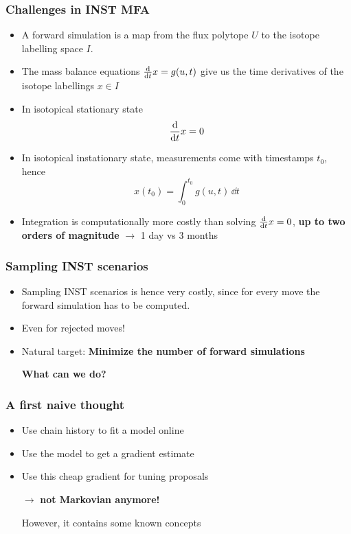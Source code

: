 \begin{frame}
    \frametitle{Challenges in INST \Ciso MFA}
    \begin{itemize}
	\item A forward simulation is a map from the flux polytope $U$ to the isotope labelling space $I$.
	\item The mass balance equations $\dv{t}x = g(u,t)$ give us the time derivatives of the isotope labellings $x \in I$
	\item In isotopical stationary state $$\dv{t}x =0$$
	\item In isotopical instationary state, measurements come with timestamps $t_0$, hence
	$$
	    x(t_0) = \int_0^{t_0} g(u,t)\,\dd t
	$$
	\item Integration is computationally more costly than solving $\dv{t}x=0$, \textbf{up to two orders of magnitude} 
	    $\to$ 1 day vs 3 months
    \end{itemize}
\end{frame}

\begin{frame}
    \frametitle{Sampling INST scenarios}
    \begin{itemize}
	\item Sampling INST scenarios is hence very costly, since for every move the forward simulation has to be computed.
	\item Even for rejected moves!
	\item Natural target: \textbf{Minimize the number of forward simulations}
	\item[]
	\item[]\textbf{What can we do?}
    \end{itemize}
\end{frame}

\begin{frame}
    \frametitle{A first naive thought}
    \begin{itemize}
	\item Use chain history to fit a model online
	\item Use the model to get a gradient estimate
	\item Use this cheap gradient for tuning proposals \\
	\item[]
	\item[$\to$] \textbf{not Markovian anymore!} 
	\item[] However, it contains some known concepts
    \end{itemize}
\end{frame}

